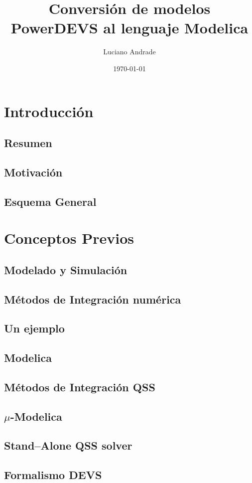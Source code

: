 \documentclass{beamer}
\title{Conversión de modelos PowerDEVS al lenguaje Modelica}
\author{Luciano Andrade}
\institute[UNR] 
{
Universidad Nacional de Rosario\\
\medskip
\textit{andrade.luciano@gmail.com}
}
\date{\today}
\begin{document}
\begin{frame}
\titlepage %
\end{frame}

\section{Introducción}
	\subsection{Resumen}
	\subsection{Motivación}
	\subsection{Esquema General}
\section{Conceptos Previos}
	\subsection{Modelado y Simulación}
	\subsection{Métodos de Integración numérica}
	\subsection{Un ejemplo}
	\subsection{Modelica}
	\subsection{Métodos de Integración QSS}
	\subsection{$\mu$-Modelica}
	\subsection{Stand–Alone QSS solver}
	\subsection{Formalismo DEVS}
\end{document}
